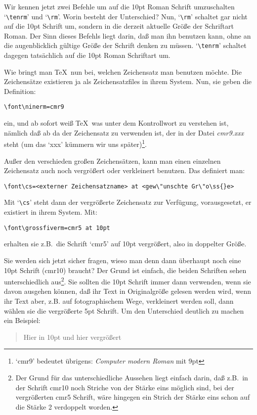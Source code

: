 Wir kennen jetzt zwei Befehle um auf die 10pt Roman Schrift
umzuschalten `\verb|\tenrm|' und 
`\verb|\rm|'. Worin besteht der
Unterschied? Nun, `\verb|\rm|' schaltet gar nicht auf die 10pt Schrift
um, sondern in die derzeit aktuelle Gr\"o\ss{}e der Schriftart 
Roman. Der
Sinn dieses Befehls liegt darin, da\ss{} man ihn benutzen kann, ohne an
die augenblicklich g\"ultige Gr\"o\ss{}e der Schrift denken zu m\"ussen.
`\verb|\tenrm|' schaltet dagegen tats\"achlich auf die 10pt
Roman
Schriftart um.

Wie bringt man \TeX\ nun bei, welchen Zeichensatz man benutzen m\"ochte.
Die Zeichens\"atze existieren ja als 
Zeichensatzfiles in ihrem System.
Nun, sie geben die Definition:
\begin{verbatim}
\font\ninerm=cmr9
\end{verbatim}
ein, und ab sofort wei\ss{} \TeX\ was unter dem Kontrollwort zu verstehen
ist, n\"amlich da\ss{} ab da der Zeichensatz zu verwenden ist, der in der
Datei {\em cmr9.xxx} steht (um das `xxx' k\"ummern wir uns
sp\"ater)\footnote{`cmr9' bedeutet \"ubrigens: {\em Computer modern
Roman} mit 9pt}.

Au\ss{}er den verschieden gro\ss{}en Zeichens\"atzen, kann man einen einzelnen
Zeichensatz auch noch vergr\"o\ss{}ert oder verkleinert benutzen. Das
definiert man:
\begin{verbatim}
\font\cs=<externer Zeichensatzname> at <gew\"unschte Gr\"o\ss{}e>
\end{verbatim}
Mit `\verb|\cs|' steht dann der vergr\"o\ss{}erte Zeichensatz zur Verf\"ugung,
vorausgesetzt, er existiert in ihrem System. Mit:
\begin{verbatim}
\font\grossfiverm=cmr5 at 10pt
\end{verbatim}
erhalten sie z.B.\ die Schrift `cmr5' auf 10pt vergr\"o\ss{}ert, also in
doppelter Gr\"o\ss{}e.

Sie werden sich jetzt sicher fragen, wieso man denn dann \"uberhaupt
noch eine 10pt Schrift (cmr10) braucht? Der Grund ist einfach, die
beiden Schriften sehen unterschiedlich aus\footnote{Der Grund f\"ur das
unterschiedliche Aussehen liegt einfach darin, da\ss{} z.B.\ in der Schrift
cmr10 noch Striche von der St\"arke eins m\"oglich sind, bei der
vergr\"o\ss{}erten cmr5 Schrift, w\"are hingegen ein Strich der St\"arke eins
schon auf die St\"arke 2 verdoppelt worden.}. Sie sollten die 10pt
Schrift immer dann verwenden, wenn sie davon ausgehen k\"onnen, da\ss{} ihr
Text in Originalgr\"o\ss{}e gelesen werden wird, wenn ihr Text aber, z.B.
auf fotographischem Wege, verkleinert werden soll, dann w\"ahlen sie die
vergr\"o\ss{}erte 5pt Schrift. Um den Unterschied deutlich zu machen ein
Beispiel:
\begin{quote}
Hier in 10pt {\grossfiverm und hier vergr\"o\ss{}ert}
\end{quote}

